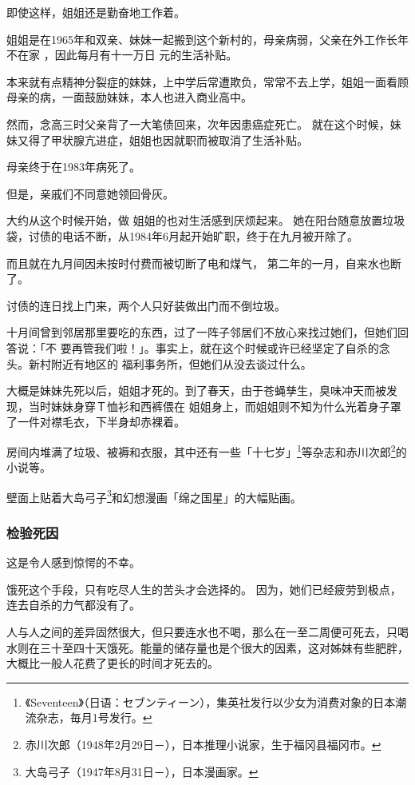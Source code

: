 \documentclass[UTF8]{ctexart}
\begin{document}
即使这样，姐姐还是勤奋地工作着。

姐姐是在1965年和双亲、妹妹一起搬到这个新村的，母亲病弱，父亲在外工作长年不在家 ，因此每月有十一万日 元的生活补贴。

本来就有点精神分裂症的妹妹，上中学后常遭欺负，常常不去上学，姐姐一面看顾母亲的病，一面鼓励妹妹，本人也进入商业高中。

然而，念高三时父亲背了一大笔债回来，次年因患癌症死亡。
就在这个时候，妹妹又得了甲状腺亢进症，姐姐也因就职而被取消了生活补贴。 

母亲终于在1983年病死了。

但是，亲戚们不同意她领回骨灰。

大约从这个时候开始，做 姐姐的也对生活感到厌烦起来。
她在阳台随意放置垃圾袋，讨债的电话不断，从1984年6月起开始旷职，终于在九月被开除了。

而且就在九月间因未按时付费而被切断了电和煤气， 第二年的一月，自来水也断了。

讨债的连日找上门来，两个人只好装做出门而不倒垃圾。

十月间曾到邻居那里要吃的东西，过了一阵子邻居们不放心来找过她们，但她们回答说：「不 要再管我们啦！」。事实上，就在这个时候或许已经坚定了自杀的念头。新村附近有地区的 福利事务所，但她们从没去谈过什么。

大概是妹妹先死以后，姐姐才死的。到了春天，由于苍蝇孳生，臭味冲天而被发现，当时妹妹身穿Ｔ恤衫和西裤偎在 姐姐身上，而姐姐则不知为什么光着身子罩了一件对襟毛衣，下半身却赤裸着。

房间内堆满了垃圾、被褥和衣服，其中还有一些「十七岁」\footnote{《Seventeen》（日语：セブンティーン），集英社发行以少女为消费对象的日本潮流杂志，毎月1号发行。}等杂志和赤川次郎\footnote{赤川次郎（1948年2月29日－\qquad \qquad），日本推理小说家，生于福冈县福冈市。}的小说等。

壁面上贴着大岛弓子\footnote{大岛弓子（1947年8月31日－\qquad \qquad ），日本漫画家。}和幻想漫画「绵之国星」的大幅贴画。

\subsubsection*{检验死因}

这是令人感到惊愕的不幸。

饿死这个手段，只有吃尽人生的苦头才会选择的。
因为，她们已经疲劳到极点，连去自杀的力气都没有了。

人与人之间的差异固然很大，但只要连水也不喝，那么在一至二周便可死去，只喝水则在三十至四十天饿死。能量的储存量也是个很大的因素，这对姊妹有些肥胖，大概比一般人花费了更长的时间才死去的。
\end{document}
